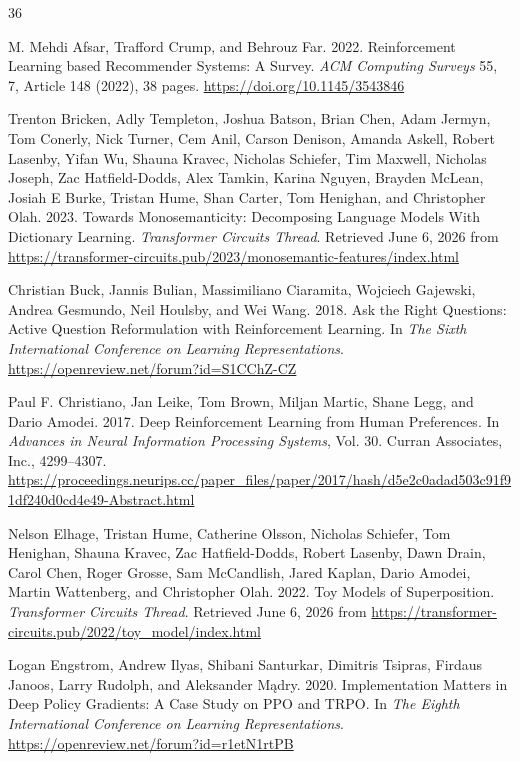 \documentclass[sigconf]{acmart}
\begin{document}
\begin{thebibliography}{36}

M. Mehdi Afsar, Trafford Crump, and Behrouz Far. 2022. Reinforcement Learning based Recommender Systems: A Survey. \textit{ACM Computing Surveys} 55, 7, Article 148 (2022), 38 pages. \url{https://doi.org/10.1145/3543846}

Trenton Bricken, Adly Templeton, Joshua Batson, Brian Chen, Adam Jermyn, Tom Conerly, Nick Turner, Cem Anil, Carson Denison, Amanda Askell, Robert Lasenby, Yifan Wu, Shauna Kravec, Nicholas Schiefer, Tim Maxwell, Nicholas Joseph, Zac Hatfield-Dodds, Alex Tamkin, Karina Nguyen, Brayden McLean, Josiah E Burke, Tristan Hume, Shan Carter, Tom Henighan, and Christopher Olah. 2023. Towards Monosemanticity: Decomposing Language Models With Dictionary Learning. \textit{Transformer Circuits Thread}. Retrieved June 6, 2026 from \url{https://transformer-circuits.pub/2023/monosemantic-features/index.html}

Christian Buck, Jannis Bulian, Massimiliano Ciaramita, Wojciech Gajewski, Andrea Gesmundo, Neil Houlsby, and Wei Wang. 2018. Ask the Right Questions: Active Question Reformulation with Reinforcement Learning. In \textit{The Sixth International Conference on Learning Representations}. \url{https://openreview.net/forum?id=S1CChZ-CZ}

Paul F. Christiano, Jan Leike, Tom Brown, Miljan Martic, Shane Legg, and Dario Amodei. 2017. Deep Reinforcement Learning from Human Preferences. In \textit{Advances in Neural Information Processing Systems}, Vol. 30. Curran Associates, Inc., 4299–4307. \url{https://proceedings.neurips.cc/paper_files/paper/2017/hash/d5e2c0adad503c91f91df240d0cd4e49-Abstract.html}

Nelson Elhage, Tristan Hume, Catherine Olsson, Nicholas Schiefer, Tom Henighan, Shauna Kravec, Zac Hatfield-Dodds, Robert Lasenby, Dawn Drain, Carol Chen, Roger Grosse, Sam McCandlish, Jared Kaplan, Dario Amodei, Martin Wattenberg, and Christopher Olah. 2022. Toy Models of Superposition. \textit{Transformer Circuits Thread}. Retrieved June 6, 2026 from \url{https://transformer-circuits.pub/2022/toy_model/index.html}

Logan Engstrom, Andrew Ilyas, Shibani Santurkar, Dimitris Tsipras, Firdaus Janoos, Larry Rudolph, and Aleksander M\k{a}dry. 2020. Implementation Matters in Deep Policy Gradients: A Case Study on PPO and TRPO. In \textit{The Eighth International Conference on Learning Representations}. \url{https://openreview.net/forum?id=r1etN1rtPB}


\end{thebibliography}
\end{document}

